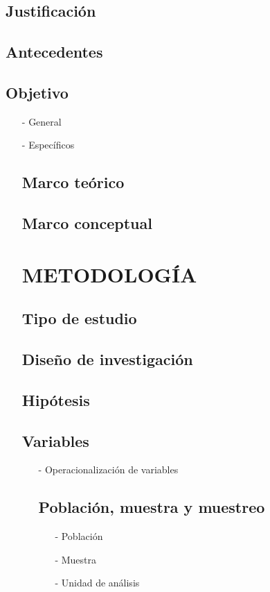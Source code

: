\documentclass{report}
\begin{document}
\subsection{Justificación}
\subsection{Antecedentes}
\subsection{Objetivo}
\begin{enumerate}
\item[-] General
\item[-] Específicos
\begin{enumerate}
\subsection{Marco teórico}
\subsection{Marco conceptual}

\section{METODOLOGÍA}
\subsection{Tipo de estudio}
\subsection{Diseño de investigación}
\subsection{Hipótesis}
\subsection{Variables}
\begin{enumerate}
\item[-] Operacionalización de variables
\begin{enumerate}
\subsection{Población, muestra y muestreo}
\begin{enumerate}
\item[-] Población
\item[-] Muestra
\item[-] Unidad de análisis
\begin{enumerate}

\end{enumerate}
\end{enumerate}
\end{enumerate}
\end{enumerate}
\end{enumerate}
\end{enumerate}
\end{document}
